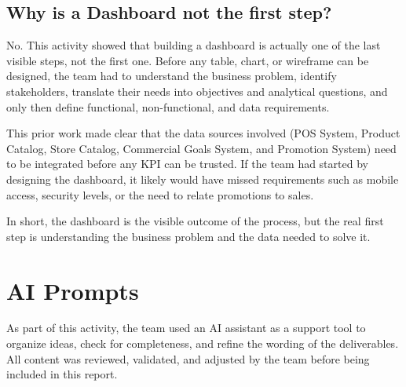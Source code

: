 \documentclass[12pt,a4paper]{article}
\begin{document}
\subsection{Why is a Dashboard not the first step?}

No. This activity showed that building a dashboard is actually one of the last visible steps, not the first one. Before any table, chart, or wireframe can be designed, the team had to understand the business problem, identify stakeholders, translate their needs into objectives and analytical questions, and only then define functional, non-functional, and data requirements.

This prior work made clear that the data sources involved (POS System, Product Catalog, Store Catalog, Commercial Goals System, and Promotion System) need to be integrated before any KPI can be trusted. If the team had started by designing the dashboard, it likely would have missed requirements such as mobile access, security levels, or the need to relate promotions to sales.

In short, the dashboard is the visible outcome of the process, but the real first step is understanding the business problem and the data needed to solve it.

\section{AI Prompts}

As part of this activity, the team used an AI assistant as a support tool to organize ideas, check for completeness, and refine the wording of the deliverables. All content was reviewed, validated, and adjusted by the team before being included in this report.
\end{document}
